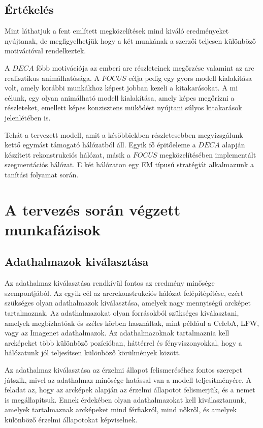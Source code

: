 \documentclass[12pt,a4]{article}
\begin{document}
 	      \subsection{Értékelés}

            Mint láthatjuk a fent említett megközelítések mind kiváló eredményeket nyújtanak, de megfigyelhetjük hogy a két munkának a szerzői teljesen különböző motivációval rendelkeztek.
            
         	A $DECA$ főbb motivációja az emberi arc részleteinek megőrzése valamint az arc realisztikus animálhatósága. A $FOCUS$ célja pedig egy gyors modell kialakítása volt, amely korábbi munkákhoz képest jobban kezeli a kitakarásokat. A mi célunk, egy olyan animálható modell kialakítása, amely képes megőrízni a részleteket, emellett képes konzisztens mükődést nyújtani súlyos kitakarások jelenlétében is.
 	
 	          Tehát a tervezett modell, amit a későbbiekben részletesebben
 	          megvizsgálunk kettő egymást támogató hálózatból áll. Egyik fő 
            épitőeleme a $DECA$ alapján készített rekonstrukciós hálózat, másik a $FOCUS$ megközelítésében implementált szegmentációs hálózat. E két hálózaton egy EM típusú stratégiát alkalmazunk a tanítási folyamat során.


    \section{A tervezés során végzett munkafázisok}

        \subsection{Adathalmazok kiválasztása}

        Az adathalmaz kiválasztása rendkívül fontos az eredmény minősége szempontjából. Az egyik cél az arcrekonstrukciós hálózat felépítépítése, ezért szükséges olyan adathalmazok kiválasztása, amelyek nagy mennyiségű arcképet tartalmaznak. Az adathalmazokat olyan forrásokból szükséges kiválasztani, amelyek megbízhatóak és széles körben használtak, mint például a CelebA, LFW, vagy az Imagenet adathalmazok. Az adathalmazoknak tartalmaznia kell arcképeket több különböző pozícióban, háttérrel és fényviszonyokkal, hogy a hálózatunk jól teljesítsen különböző körülmények között.

        Az adathalmaz kiválasztása az érzelmi állapot felismeréséhez fontos szerepet játszik, mivel az adathalmaz minősége hatással van a modell teljesítményére. A feladat az, hogy az arcképek alapján az érzelmi állapotot felismerjük, és a nemet is megállapítsuk. Ennek érdekében olyan adathalmazokat kell kiválasztanunk, amelyek tartalmaznak arcképeket mind férfiakról, mind nőkről, és amelyek különböző érzelmi állapotokat képviselnek.
\end{document}
